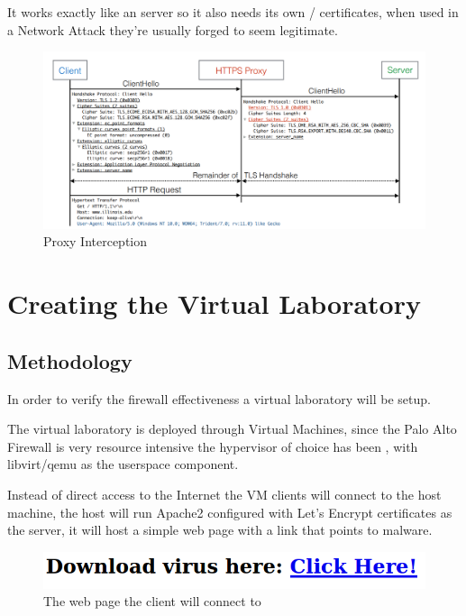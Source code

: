 It works exactly like an  server so it also needs its own / certificates, when used in a Network Attack they're usually forged to seem legitimate.

\begin{figure}[h!]
 \centering
 \includegraphics[width=13cm]{img/https_proxy_interception.png}
 \caption{ Proxy Interception\protect\cite{https-interception}}
 \label{fig: HTTPS Proxy Interception}
\end{figure}


\chapter{Creating the Virtual Laboratory}
\section{Methodology}

In order to verify the firewall effectiveness a virtual laboratory will be setup.

The virtual laboratory is deployed through Virtual Machines, since the Palo Alto Firewall is very resource intensive the hypervisor of choice has been \cite{kvm}, with libvirt/qemu\cite{libvirt}\cite{qemu} as the userspace component.

Instead of direct access to the Internet the VM clients will connect to the host machine, the host will run Apache2\cite{apache2} configured with Let's Encrypt\cite{letsencrypt} certificates as the  server, it will host a simple web page with a link that points to malware.

\begin{figure}[h!]
 \centering
 \includegraphics[width=13cm]{img/webpage.png}
 \caption{The web page the client will connect to}
 \label{fig: webpage}
\end{figure}

